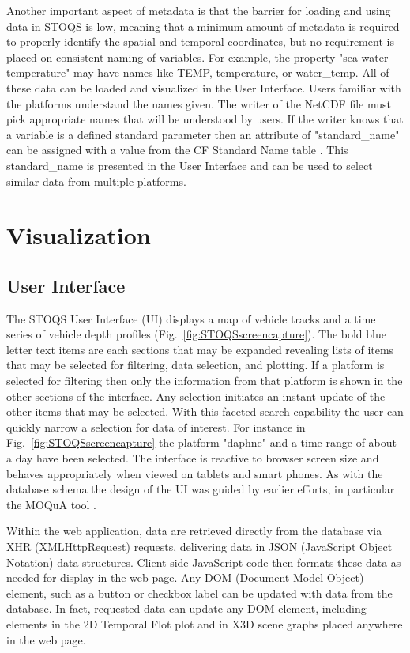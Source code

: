 \documentclass[conference]{IEEEtran}
\begin{document}
Another important aspect of metadata is that the barrier for loading and using data in STOQS is low, meaning that a minimum amount of metadata is required to properly identify the spatial and temporal coordinates, but no requirement is placed on consistent naming of variables. For example, the property "sea water temperature" may have names like TEMP, temperature, or water\_temp. All of these data can be loaded and visualized in the User Interface. Users familiar with the platforms understand the names given. The writer of the NetCDF file must pick appropriate names that will be understood by users. If the writer knows that a variable is a defined standard parameter then an attribute of "standard\_name" can be assigned with a value from the CF Standard Name table \cite{CFSN}. This standard\_name is presented in the User Interface and can be used to select similar data from multiple platforms.


\section{Visualization}

\subsection{User Interface}

The STOQS User Interface (UI) displays a map of vehicle tracks and a time series of vehicle depth profiles (Fig.~\ref{fig:STOQSscreencapture}). The bold blue letter text items are each sections that may be expanded revealing lists of items that may be selected for filtering, data selection, and plotting. If a platform is selected for filtering then only the information from that platform is shown in the other sections of the interface. Any selection initiates an instant update of the other items that may be selected. With this faceted search capability the user can quickly narrow a selection for data of interest. For instance in Fig.~\ref{fig:STOQSscreencapture} the platform "daphne"  and a time range of about a day have been selected. The interface is reactive to browser screen size and behaves appropriately when viewed on tablets and smart phones. As with the database schema the design of the UI was guided by earlier efforts, in particular the MOQuA tool \cite{godin05}.

Within the web application, data are retrieved directly from the database via XHR (XMLHttpRequest) requests, delivering data in JSON (JavaScript Object Notation) data structures. Client-side JavaScript code then formats these data as needed for display in the web page. Any DOM (Document Model Object) element, such as a button or checkbox label can be updated with data from the database. In fact, requested data can update any DOM element, including elements in the 2D Temporal Flot plot and in X3D scene graphs placed anywhere in the web page.
\end{document}
